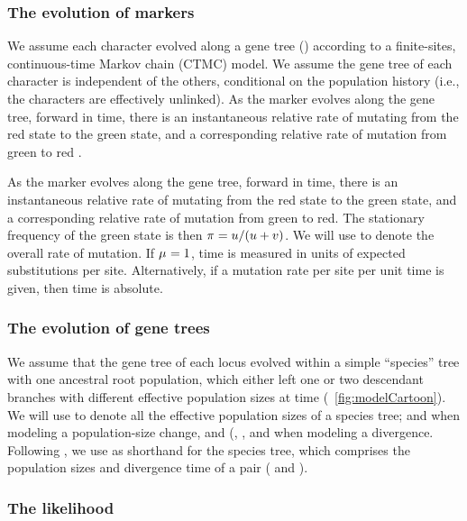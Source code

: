 \subsubsection{The evolution of markers}

We assume each character evolved along a gene tree (\genetree)
according to a finite-sites, continuous-time Markov chain (CTMC) model.
We assume the gene tree of each character is independent of the others,
conditional on the population history (i.e., the characters are effectively
unlinked).
As the marker evolves along the gene tree, forward in time, there is an
instantaneous relative rate \rgmurate of mutating from the red state to the
green state, and a corresponding relative rate \grmurate of mutation from
green to red \citep{Bryant2012,Oaks2018ecoevolity}.

As the marker evolves along the gene tree, forward in time, there is an
instantaneous relative rate \rgmurate of mutating from the red state to the
green state, and a corresponding relative rate \grmurate of mutation from green
to red.
The stationary frequency of the green state is then
$\pi_{} = u / (u + v)$.
We will use \murate to denote the overall rate of mutation.
If $\mu_{} = 1$, time is measured in
units of expected substitutions per site.
Alternatively, if a mutation rate per site per unit time is given, then time is
absolute.

\subsubsection{The evolution of gene trees}

We assume that the gene tree of each locus evolved within a simple
``species'' tree with one ancestral root population, which either
left one or two descendant branches with different effective population sizes
at time \comparisondivtime
(\fig{}~\ref{fig:modelCartoon}).
We will use
\comparisonpopsizes{}
to denote all the effective population sizes of a species tree;
\epopsize[\rootpopindex] and 
\epopsize[\descendantpopindex{1}] when modeling a population-size change, and
(\epopsize[\rootpopindex],
\epopsize[\descendantpopindex{1}],
and \epopsize[\descendantpopindex{2}] when modeling a divergence.
Following \citet{Oaks2018ecoevolity}, we use
\sptree{}
as shorthand for the species tree, which comprises the population sizes and
divergence time of a pair
(\comparisonpopsizes{} and \comparisondivtime{}).


\subsubsection{The likelihood}

